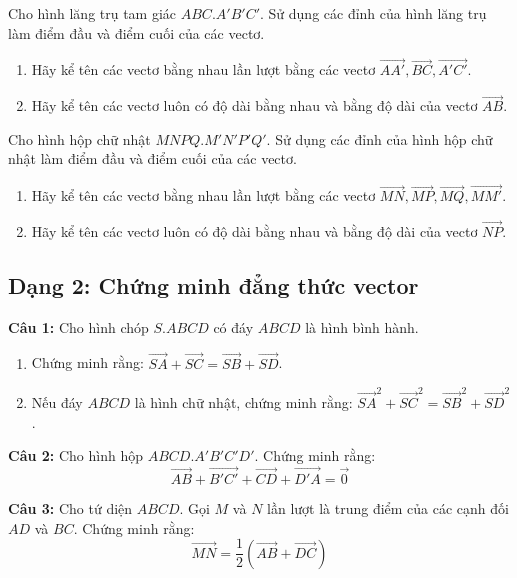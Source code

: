 \documentclass[12pt]{article}
\begin{document}
	\begin{btvang}[]
		Cho hình lăng trụ tam giác $ABC.A'B'C'$. Sử dụng các đỉnh của hình lăng trụ làm điểm đầu và điểm cuối của các vectơ.
		\begin{enumerate}[label=\alph*)]
			\item Hãy kể tên các vectơ bằng nhau lần lượt bằng các vectơ $\overrightarrow{AA'}, \overrightarrow{BC}, \overrightarrow{A'C'}$.
			\item Hãy kể tên các vectơ luôn có độ dài bằng nhau và bằng độ dài của vectơ $\overrightarrow{AB}$.
		\end{enumerate}
	\end{btvang}
	
	\begin{btdo}[]
		Cho hình hộp chữ nhật $MNPQ.M'N'P'Q'$. Sử dụng các đỉnh của hình hộp chữ nhật làm điểm đầu và điểm cuối của các vectơ.
		\begin{enumerate}[label=\alph*)]
			\item Hãy kể tên các vectơ bằng nhau lần lượt bằng các vectơ $\overrightarrow{MN}, \overrightarrow{MP}, \overrightarrow{MQ}, \overrightarrow{MM'}$.
			\item Hãy kể tên các vectơ luôn có độ dài bằng nhau và bằng độ dài của vectơ $\overrightarrow{NP}$.
		\end{enumerate}
	\end{btdo}
	
	\subsection{Dạng 2: Chứng minh đẳng thức vector}	
	
	
	\begin{btxanh}[]
		\textbf{Câu 1:} Cho hình chóp $S.ABCD$ có đáy $ABCD$ là hình bình hành.
		\begin{enumerate}[label=\alph*)]
			\item Chứng minh rằng: $\overrightarrow{SA} + \overrightarrow{SC} = \overrightarrow{SB} + \overrightarrow{SD}$.
			\item Nếu đáy $ABCD$ là hình chữ nhật, chứng minh rằng: $\overrightarrow{SA}^2 + \overrightarrow{SC}^2 = \overrightarrow{SB}^2 + \overrightarrow{SD}^2$.
		\end{enumerate}
		
		\vspace{0.2cm}
		\textbf{Câu 2:} Cho hình hộp $ABCD.A'B'C'D'$. Chứng minh rằng:
		$$ \overrightarrow{AB} + \overrightarrow{B'C'} + \overrightarrow{CD} + \overrightarrow{D'A} = \vec{0} $$
		
		\vspace{0.2cm}
		\textbf{Câu 3:} Cho tứ diện $ABCD$. Gọi $M$ và $N$ lần lượt là trung điểm của các cạnh đối $AD$ và $BC$. Chứng minh rằng:
		$$ \overrightarrow{MN} = \frac{1}{2}(\overrightarrow{AB} + \overrightarrow{DC}) $$
	\end{btxanh}
	
\end{document}
